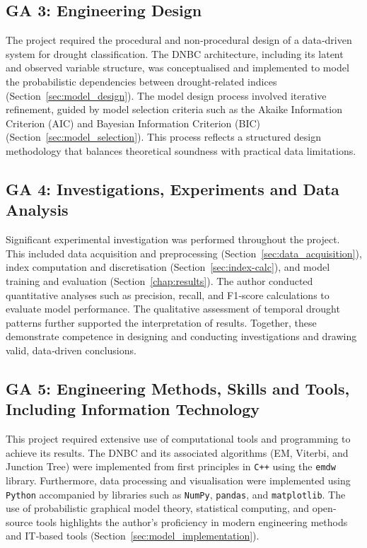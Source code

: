 \subsection*{GA 3: Engineering Design}
The project required the procedural and non‐procedural design of a data‐driven system for drought classification. The DNBC architecture, including its latent and observed variable structure, was conceptualised and implemented to model the probabilistic dependencies between drought‐related indices (Section~\ref{sec:model_design}). The model design process involved iterative refinement, guided by model selection criteria such as the Akaike Information Criterion (AIC) and Bayesian Information Criterion (BIC) (Section~\ref{sec:model_selection}). This process reflects a structured design methodology that balances theoretical soundness with practical data limitations.

\subsection*{GA 4: Investigations, Experiments and Data Analysis}
Significant experimental investigation was performed throughout the project. This included data acquisition and preprocessing (Section~\ref{sec:data_acquisition}), index computation and discretisation (Section~\ref{sec:index-calc}), and model training and evaluation (Section~\ref{chap:results}). The author conducted quantitative analyses such as precision, recall, and F1‐score calculations to evaluate model performance. The qualitative assessment of temporal drought patterns further supported the interpretation of results. Together, these demonstrate competence in designing and conducting investigations and drawing valid, data‐driven conclusions.

\subsection*{GA 5: Engineering Methods, Skills and Tools, Including Information Technology}
This project required extensive use of computational tools and programming to achieve its results. The DNBC and its associated algorithms (EM, Viterbi, and Junction Tree) were implemented from first principles in \texttt{C++} using the \texttt{emdw} library. Furthermore, data processing and visualisation were implemented using \texttt{Python}  accompanied by libraries such as \texttt{NumPy}, \texttt{pandas}, and \texttt{matplotlib}. The use of probabilistic graphical model theory, statistical computing, and open‐source tools highlights the author’s proficiency in modern engineering methods and IT‐based tools (Section~\ref{sec:model_implementation}).

